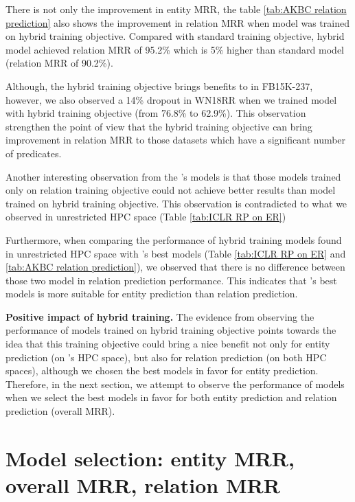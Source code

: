 There is not only the improvement in entity MRR, the table \ref{tab:AKBC relation prediction} also shows the improvement in relation MRR when model was trained on hybrid training objective. Compared with standard training objective, hybrid model achieved relation MRR of 95.2\% which is 5\% higher than standard model (relation MRR of 90.2\%). 

Although, the hybrid training objective brings benefits to in FB15K-237, however, we also observed a 14\% dropout in WN18RR when we trained model with hybrid training objective (from 76.8\% to 62.9\%). This observation strengthen the point of view that the hybrid training objective can bring improvement in relation MRR to those datasets which have a significant number of predicates.  

Another interesting observation from the \cite{chen2021relation}'s models is that those models trained only on relation training objective could not achieve better results than model trained on hybrid training objective. This observation is contradicted to what we observed in unrestricted HPC space (Table \ref{tab:ICLR RP on ER})

Furthermore, when comparing the performance of hybrid training models found in unrestricted HPC space with \cite{chen2021relation}'s best models (Table \ref{tab:ICLR RP on ER} and \ref{tab:AKBC relation prediction}), we observed that there is no difference between those two model in relation prediction performance. This indicates that \cite{chen2021relation}'s best models is more suitable for entity prediction than relation prediction.
\newline




\noindent\textbf{Positive impact of hybrid training.} The evidence from observing the performance of models trained on hybrid training objective points towards the idea that this training objective could bring a nice benefit not only for entity prediction (on \citet{chen2021relation}'s HPC space), but also for relation prediction (on both HPC spaces), although we chosen the best models in favor for entity prediction. Therefore, in the next section, we attempt to observe the performance of models when we select the best models in favor for both entity prediction and relation prediction (overall MRR). 



\section[Model selection]{Model selection: entity MRR, overall MRR, relation MRR}

